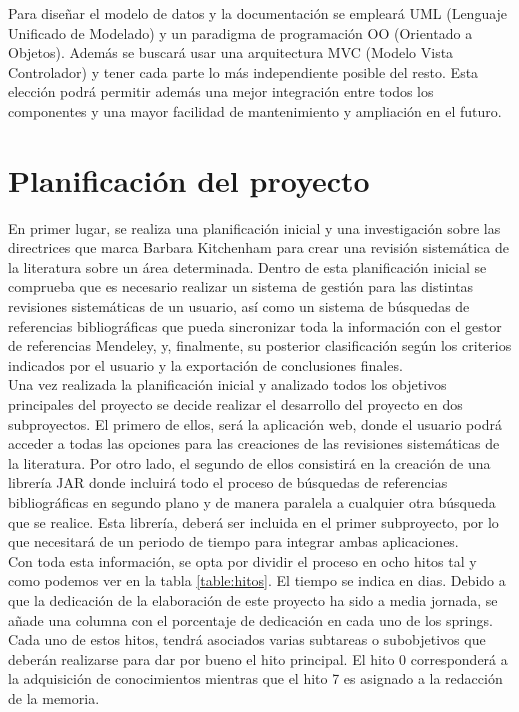 Para diseñar el modelo de datos y la documentación se empleará UML (Lenguaje Unificado de Modelado) y un paradigma de programación OO (Orientado a Objetos). Además se buscará usar una arquitectura MVC (Modelo Vista Controlador) y tener cada parte lo más independiente posible del resto. Esta elección podrá permitir además una mejor integración entre todos los componentes y una mayor facilidad de mantenimiento y ampliación en el futuro.

\section{Planificación del proyecto}
En primer lugar, se realiza una planificación inicial y una investigación sobre las directrices que marca Barbara Kitchenham para crear una revisión sistemática de la literatura sobre un área determinada. Dentro de esta planificación inicial se comprueba que es necesario realizar un sistema de gestión para las distintas revisiones sistemáticas de un usuario, así como un sistema de búsquedas de referencias bibliográficas que pueda sincronizar toda la información con el gestor de referencias Mendeley, y, finalmente, su posterior clasificación según los criterios indicados por el usuario y la exportación de conclusiones finales.\\

Una vez realizada la planificación inicial y analizado todos los objetivos principales del proyecto se decide realizar el desarrollo del proyecto en dos subproyectos. El primero de ellos, será la aplicación web, donde el usuario podrá acceder a todas las opciones para las creaciones de las revisiones sistemáticas de la literatura. Por otro lado, el segundo de ellos consistirá en la creación de una librería JAR donde incluirá todo el proceso de búsquedas de referencias bibliográficas en segundo plano y de manera paralela a cualquier otra búsqueda que se realice. Esta librería, deberá ser incluida en el primer subproyecto, por lo que necesitará de un periodo de tiempo para integrar ambas aplicaciones.\\

Con toda esta información, se opta por dividir el proceso en ocho hitos tal y como podemos ver en la tabla \ref{table:hitos}. El tiempo se indica en dias. Debido a que la dedicación de la elaboración de este proyecto ha sido a media jornada, se añade una columna con el porcentaje de dedicación en cada uno de los springs. Cada uno de estos hitos, tendrá asociados varias subtareas o subobjetivos que deberán realizarse para dar por bueno el hito principal. El hito 0 corresponderá a la adquisición de conocimientos mientras que el hito 7 es asignado a la redacción de la memoria.\\

